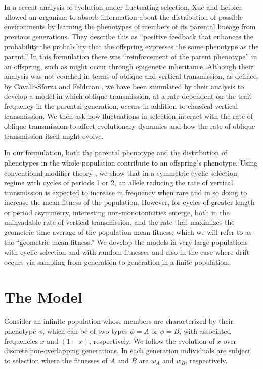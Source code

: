 \documentclass[9pt,twocolumn,twoside,lineno]{pnas-new}
\begin{document}
In a recent analysis of evolution under fluctuating selection, Xue and Leibler \cite{xue2016evolutionary} allowed an organism to absorb information about the distribution of possible environments by learning the phenotypes of members of its parental lineage from previous generations. They describe this as ``positive feedback that enhances the probability the probability that the offspring expresses the same phenotype as the parent.'' In this formulation there was ``reinforcement of the parent phenotype'' in an offspring, such as might occur through epigenetic inheritance. Although their analysis was not couched in terms of oblique and vertical transmission, as defined by Cavalli-Sforza and Feldman \cite{cavalli1981cultural}, we have been stimulated by their analysis to develop a model in which oblique transmission, at a rate dependent on the trait frequency in the parental generation, occurs in addition to classical vertical transmission. We then ask how fluctuations in selection interact with the rate of oblique transmission to affect evolutionary dynamics and how the rate of oblique transmission itself might evolve. 

In our formulation, both the parental phenotype and the distribution of phenotypes in the whole population contribute to an offspring's phenotype. Using conventional modifier theory \cite{feldman1986evolutionary}, we show that in a symmetric cyclic selection regime with cycles of periods 1 or 2, an allele reducing the rate of vertical transmission is expected to increase in frequency when rare and in so doing to increase the mean fitness of the population. However, for cycles of greater length or period asymmetry, interesting non-monotonicities emerge, both in the uninvadable rate of vertical transmission, and the rate that maximizes the geometric time average of the population mean fitness, which we will refer to as the ``geometric mean fitness.'' We develop the models in very large populations with cyclic selection and with random fitnesses and also in the case where drift occurs via sampling from generation to generation in a finite population.

\section{The Model}

Consider an infinite population whose members are characterized by their phenotype $\phi$, which can be of two types $\phi=A$ or $\phi=B$, with associated frequencies $x$ and $(1-x)$, respectively. We follow the evolution of $x$ over discrete non-overlapping generations. In each generation individuals are subject to  selection where the fitnesses of $A$ and $B$ are $w_A$ and $w_B$, respectively.
\end{document}

